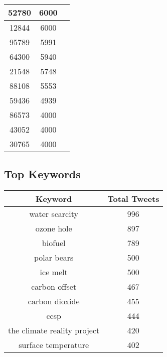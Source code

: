 \documentclass{article}\usepackage[T1]{fontenc}
\begin{document}
\begin{tabular}{|c|c|c|}
 \hline
52780 & 6000\\ 
 \hline
12844 & 6000\\ 
 \hline
95789 & 5991\\ 
 \hline
64300 & 5940\\ 
 \hline
21548 & 5748\\ 
 \hline
88108 & 5553\\ 
 \hline
59436 & 4939\\ 
 \hline
86573 & 4000\\ 
 \hline
43052 & 4000\\ 
 \hline
30765 & 4000\\ 
 \hline
\end{tabular}\subsection*{Top Keywords}\begin{tabular}{|c|c|}         \hline         Keyword & Total Tweets \\ 
 \hline
water scarcity & 996\\ 
 \hline
ozone hole & 897\\ 
 \hline
biofuel & 789\\ 
 \hline
polar bears & 500\\ 
 \hline
ice melt & 500\\ 
 \hline
carbon offset & 467\\ 
 \hline
carbon dioxide & 455\\ 
 \hline
ccsp & 444\\ 
 \hline
the climate reality project & 420\\ 
 \hline
surface temperature & 402\\ 
 \hline
\end{tabular}
\end{document}
